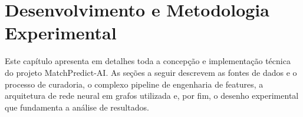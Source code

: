 
\chapter{Desenvolvimento e Metodologia Experimental}
\label{chap:desenvolvimento}

Este capítulo apresenta em detalhes toda a concepção e implementação técnica do projeto MatchPredict-AI. As seções a seguir descrevem as fontes de dados e o processo de curadoria, o complexo pipeline de engenharia de features, a arquitetura de rede neural em grafos utilizada e, por fim, o desenho experimental que fundamenta a análise de resultados.





